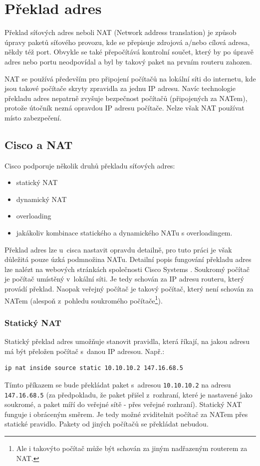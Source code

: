 \section{Překlad adres}

Překlad síťových adres neboli NAT (Network address translation) je způsob úpravy paketů síťového provozu, kde se přepisuje zdrojová a/nebo cílová adresa, někdy též port. Obvykle se také přepočítává kontrolní součet, který by po úpravě adres nebo portu neodpovídal a byl by takový paket na prvním routeru zahozen.

NAT se používá především pro připojení počítačů na lokální síti do internetu, kde jsou takové počítače skryty zpravidla za jednu IP adresu. Navíc technologie překladu adres nepatrně zvyšuje bezpečnost počítačů (připojených za NATem), protože útočník nezná opravdou IP adresu  počítače. Nelze však NAT používat místo zabezpečení.


\subsection{Cisco a NAT}
Cisco podporuje několik druhů překladu \cite{cisco:druhy} síťových adres:

\begin{itemize}
\item statický NAT
\item dynamický NAT
\item overloading
\item jakákoliv kombinace statického a dynamického NATu s overloadingem.
\end{itemize}

Překlad adres lze u~cisca nastavit opravdu detailně, pro tuto práci je však důležitá pouze úzká podmnožina NATu. Detailní popis fungování překladu adres lze nalézt na webových stránkách společnosti Cisco Systems \cite{cisco:nat}.
Soukromý počítač je počítač umístěný v~lokální síti. Je tedy schován za IP adresu routeru, který provádí překlad. Naopak veřejný počítač je takový počítač, který není schován za NATem (alespoň z~pohledu soukromého počítače\footnote{Ale i takovýto počítač může být schován za jiným nadřazeným routerem za NAT.}).

\subsubsection{Statický NAT}
Statický překlad adres umožňuje stanovit pravidla, která říkají, na jakou adresu má být přeložen počítač s~danou IP adresou. Např.:
\begin{verbatim}
ip nat inside source static 10.10.10.2 147.16.68.5
\end{verbatim} 
Tímto příkazem se bude překládat paket s~adresou \verb|10.10.10.2| na adresu \verb|147.16.68.5| (za předpokladu, že paket přišel z~rozhraní, které je nastavené jako soukromé, a paket míří do veřejné sítě - přes veřejné rozhraní). Statický NAT funguje i obráceným směrem. Je tedy možné zviditelnit počítač za NATem přes statické pravidlo. Pakety od jiných počítačů se překládat nebudou. 

